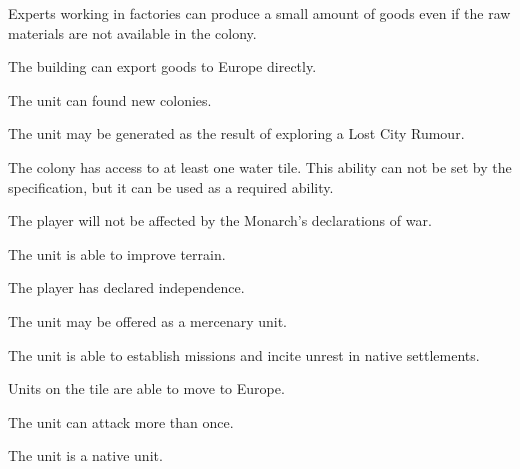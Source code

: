 \documentclass[12pt]{book}
\begin{document}
\affectsPlayer

Experts working in factories can produce a small amount of goods even
if the raw materials are not available in the colony.

\affectsBuilding

The building can export goods to Europe directly.

\affectsUnit

The unit can found new colonies.

\affectsUnit

The unit may be generated as the result of exploring a Lost City Rumour.

\affectsColony

The colony has access to at least one water tile. This ability can not
be set by the specification, but it can be used as a required ability.

\affectsPlayer

The player will not be affected by the Monarch's declarations of war.

\affectsUnit

The unit is able to improve terrain.

\affectsPlayer

The player has declared independence.

\affectsUnit

The unit may be offered as a mercenary unit.

\affectsUnit

The unit is able to establish missions and incite unrest in native
settlements.

\affectsTile

Units on the tile are able to move to Europe.

\affectsUnit

The unit can attack more than once.

\affectsUnit

The unit is a native unit.

\affectsUnit
\end{document}
